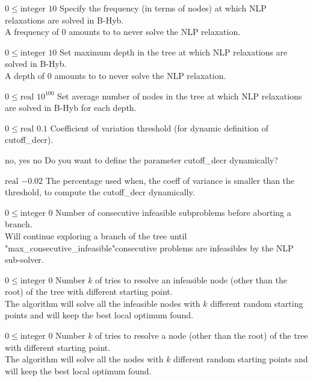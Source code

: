 %
{$0\leq\textrm{integer}$}%
{$10$}%
{Specify the frequency (in terms of nodes) at which NLP relaxations are solved in B-Hyb.\\
A frequency of 0 amounts to to never solve the NLP relaxation.}%
{}

%
{$0\leq\textrm{integer}$}%
{$10$}%
{Set maximum depth in the tree at which NLP relaxations are solved in B-Hyb.\\
A depth of 0 amounts to to never solve the NLP relaxation.}%
{}

%
{$0\leq\textrm{real}$}%
{$10^{ 100}$}%
{Set average number of nodes in the tree at which NLP relaxations are solved in B-Hyb for each depth.}%
{}

%
{$0\leq\textrm{real}$}%
{$0.1$}%
{Coefficient of variation threshold (for dynamic definition of cutoff\_decr).}%
{}

%
{no, yes}%
{no}%
{Do you want to define the parameter cutoff\_decr dynamically?}%
{
}

%
{$\textrm{real}$}%
{$-0.02$}%
{The percentage used when, the coeff of variance is smaller than the threshold, to compute the cutoff\_decr dynamically.}%
{}

%
{$0\leq\textrm{integer}$}%
{$0$}%
{Number of consecutive infeasible subproblems before aborting a branch.\\
Will continue exploring a branch of the tree until "max\_consecutive\_infeasible"consecutive problems are infeasibles by the NLP sub-solver.}%
{}

%
{$0\leq\textrm{integer}$}%
{$0$}%
{Number $k$ of tries to resolve an infeasible node (other than the root) of the tree with different starting point.\\
The algorithm will solve all the infeasible nodes with $k$ different random starting points and will keep the best local optimum found.}%
{}

%
{$0\leq\textrm{integer}$}%
{$0$}%
{Number $k$ of tries to resolve a node (other than the root) of the tree with different starting point.\\
The algorithm will solve all the nodes with $k$ different random starting points and will keep the best local optimum found.}%
{}

